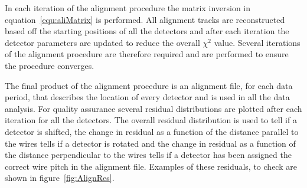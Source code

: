 
In each iteration of the alignment procedure the matrix inversion in
equation~\ref{equ:aliMatrix} is performed.  All alignment tracks are
reconstructed based off the starting positions of all the detectors
and after each iteration the detector parameters are updated to reduce
the overall $\chi^2$ value.  Several iterations of the alignment
procedure are therefore required and are performed to ensure the
procedure converges.\par

The final product of the alignment procedure is an alignment file, for
each data period, that describes the location of every detector and is
used in all the data analysis.  For quality assurance several residual
distributions are plotted after each iteration for all the detectors.
The overall residual distribution is used to tell if a detector is
shifted, the change in residual as a function of the distance parallel
to the wires tells if a detector is rotated and the change in residual
as a function of the distance perpendicular to the wires tells if a
detector has been assigned the correct wire pitch in the alignment
file.  Examples of these residuals, to check are shown in
figure~\ref{fig:AlignRes}.


